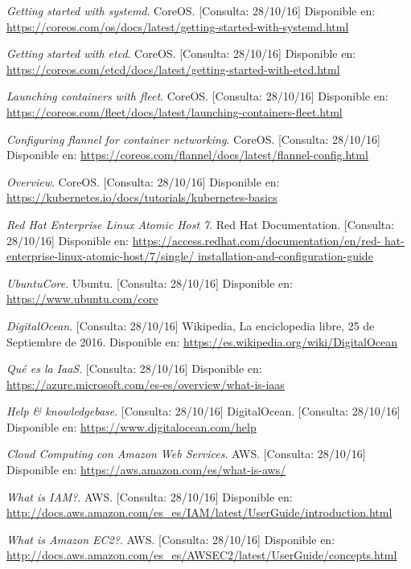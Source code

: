 \begin{thebibliography}{9}
\textit{Getting started with systemd}. CoreOS. [Consulta: 28/10/16]
Disponible en: \url{https://coreos.com/os/docs/latest/getting-started-with-systemd.html}

\textit{Getting started with etcd}. CoreOS. [Consulta: 28/10/16]
Disponible en: \url{https://coreos.com/etcd/docs/latest/getting-started-with-etcd.html}

\textit{Launching containers with fleet}. CoreOS. [Consulta: 28/10/16]
Disponible en: \url{https://coreos.com/fleet/docs/latest/launching-containers-fleet.html}

\textit{Configuring flannel for container networking}. CoreOS. [Consulta: 28/10/16]
Disponible en: \url{https://coreos.com/flannel/docs/latest/flannel-config.html}

\textit{Overview}. CoreOS. [Consulta: 28/10/16]
Disponible en: \url{https://kubernetes.io/docs/tutorials/kubernetes-basics}

\textit{Red Hat Enterprise Linux Atomic Host 7}. 
Red Hat Documentation. [Consulta: 28/10/16]
Disponible en: \url{https://access.redhat.com/documentation/en/red-
hat-enterprise-linux-atomic-host/7/single/
installation-and-configuration-guide}

\textit{UbuntuCore}. 
Ubuntu. [Consulta: 28/10/16]
Disponible en: \url{https://www.ubuntu.com/core}

\textit{DigitalOcean}. [Consulta: 28/10/16]
Wikipedia, La enciclopedia libre, 25 de Septiembre de 2016.
Disponible en: \url{https://es.wikipedia.org/wiki/DigitalOcean}

\textit{Qué es la IaaS}. [Consulta: 28/10/16]
Disponible en: \url{https://azure.microsoft.com/es-es/overview/what-is-iaas}

\textit{Help \& knowledgebase}. [Consulta: 28/10/16]
DigitalOcean. [Consulta: 28/10/16]
Disponible en: \url{https://www.digitalocean.com/help}

\textit{Cloud Computing con Amazon Web Services}. 
AWS. [Consulta: 28/10/16]
Disponible en: \url{https://aws.amazon.com/es/what-is-aws/}

\textit{What is IAM?}. 
AWS. [Consulta: 28/10/16]
Disponible en: \url{http://docs.aws.amazon.com/es_es/IAM/latest/UserGuide/introduction.html}

\textit{What is Amazon EC2?}. 
AWS. [Consulta: 28/10/16]
Disponible en: \url{http://docs.aws.amazon.com/es_es/AWSEC2/latest/UserGuide/concepts.html}


\end{thebibliography}
